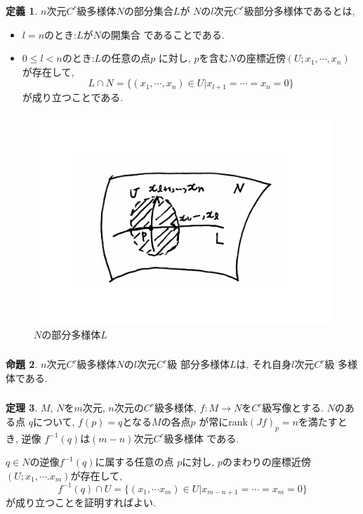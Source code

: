 \documentclass[dvipdfmx,cjk]{beamer}
\theoremstyle{definition}
\newtheorem{dfn}{\textbf{ 定義 }}
\newtheorem{thm}[dfn]{\textbf{ 定理 }}
\newtheorem{prop}[dfn]{\textbf{ 命題 }}
\begin{document}
\begin{frame}
  \frametitle{}
  \begin{dfn}\label{def:C^r-submanifold}
    $n$次元$C^r$級多様体$N$の部分集合$L$が
    $N$の$l$次元$C^r$級部分多様体であるとは, 
    \begin{itemize}
        \item[(1)]$l=n$のとき:$L$が$N$の開集合
        であることである. 
        \item[(2)] $0\leq l<n$のとき:$L$の任意の点$p$
        に対し, $p$を含む$N$の座標近傍$(U;x_1,\cdots ,x_n)$
        が存在して, 
        $$L\cap N=\{(x_1,\cdots ,x_n)\in U|
        x_{l+1}=\cdots =x_n=0\}$$
        が成り立つことである. 
    \end{itemize}
  \end{dfn}
  \begin{figure}[H]
    \centering
    \includegraphics[keepaspectratio, scale=0.2]{CrSubmanifold.pdf}
    \caption{$N$の部分多様体$L$}
    \label{CrSubmanifold}
   \end{figure}
\end{frame}

\begin{frame}
  \frametitle{}
  \begin{prop}\label{prop:dim of C^r-submanifold}
    $n$次元$C^r$級多様体$N$の$l$次元$C^r$級
    部分多様体$L$は, それ自身$l$次元$C^r$級
    多様体である. 
  \end{prop}
\end{frame}
     
\begin{frame}
  \frametitle{}
  \begin{thm}\label{theo:f^{-1}(q) C^r manifold}
    $M$, $N$を$m$次元, $n$次元の$C^r$級多様体, 
    $f:M\to N$を$C^r$級写像とする. $N$のある点
    $q$について, $f(p)=q$となる$M$の各点$p$
    が常にrank$(Jf)_p=n$を満たすとき, 逆像
    $f^{-1}(q)$は$(m-n)$次元$C^r$級多様体
    である. 
  \end{thm}
  $q\in N$の逆像$f^{-1}(q)$に属する任意の点
  $p$に対し, $p$のまわりの座標近傍
  $(U;x_1,\cdots .x_m)$が存在して, 
  $$f^{-1}(q)\cap U
  =\{(x_1,\cdots x_m)\in U|
  x_{m-n+1}=\cdots =x_m=0\}$$
  が成り立つことを証明すればよい. 
\end{frame}
\end{document}
